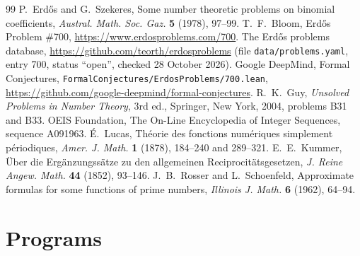 \documentclass[11pt,a4paper]{article}
\theoremstyle{definition}
\begin{document}
\begin{thebibliography}{99}
 P.~Erd\H{o}s and G.~Szekeres, Some number theoretic problems on binomial coefficients, \emph{Austral. Math. Soc. Gaz.} \textbf{5} (1978), 97--99.
 T.~F.~Bloom, Erd\H{o}s Problem \#700, \url{https://www.erdosproblems.com/700}.
 The Erd\H{o}s problems database, \url{https://github.com/teorth/erdosproblems} (file \texttt{data/problems.yaml}, entry 700, status ``open'', checked 28 October 2026).
 Google DeepMind, Formal Conjectures, \texttt{FormalConjectures/ErdosProblems/700.lean}, \url{https://github.com/google-deepmind/formal-conjectures}.
 R.~K.~Guy, \emph{Unsolved Problems in Number Theory}, 3rd ed., Springer, New York, 2004, problems B31 and B33.
 OEIS Foundation, The On-Line Encyclopedia of Integer Sequences, sequence A091963.
 \'E.~Lucas, Th\'eorie des fonctions num\'eriques simplement p\'eriodiques, \emph{Amer. J. Math.} \textbf{1} (1878), 184--240 and 289--321.
 E.~E.~Kummer, \"Uber die Erg\"anzungss\"atze zu den allgemeinen Reciprocit\"atsgesetzen, \emph{J. Reine Angew. Math.} \textbf{44} (1852), 93--146.
 J.~B.~Rosser and L.~Schoenfeld, Approximate formulas for some functions of prime numbers, \emph{Illinois J. Math.} \textbf{6} (1962), 64--94.
\end{thebibliography}

\appendix
\section{Programs}
\end{document}
